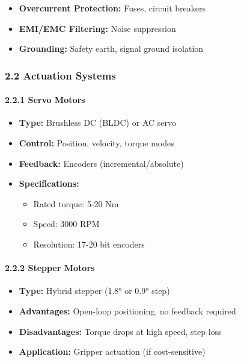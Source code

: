 \documentclass[
]{article}
\providecommand{\tightlist}{%
  \setlength{\itemsep}{0pt}\setlength{\parskip}{0pt}}
\begin{document}
\begin{itemize}
\tightlist
\item
  \textbf{Overcurrent Protection:} Fuses, circuit breakers
\item
  \textbf{EMI/EMC Filtering:} Noise suppression
\item
  \textbf{Grounding:} Safety earth, signal ground isolation
\end{itemize}

\hypertarget{actuation-systems}{%
\subsubsection{2.2 Actuation Systems}\label{actuation-systems}}

\hypertarget{servo-motors}{%
\paragraph{2.2.1 Servo Motors}\label{servo-motors}}

\begin{itemize}
\tightlist
\item
  \textbf{Type:} Brushless DC (BLDC) or AC servo
\item
  \textbf{Control:} Position, velocity, torque modes
\item
  \textbf{Feedback:} Encoders (incremental/absolute)
\item
  \textbf{Specifications:}

  \begin{itemize}
  \tightlist
  \item
    Rated torque: 5-20 Nm
  \item
    Speed: 3000 RPM
  \item
    Resolution: 17-20 bit encoders
  \end{itemize}
\end{itemize}

\hypertarget{stepper-motors}{%
\paragraph{2.2.2 Stepper Motors}\label{stepper-motors}}

\begin{itemize}
\tightlist
\item
  \textbf{Type:} Hybrid stepper (1.8° or 0.9° step)
\item
  \textbf{Advantages:} Open-loop positioning, no feedback required
\item
  \textbf{Disadvantages:} Torque drops at high speed, step loss
\item
  \textbf{Application:} Gripper actuation (if cost-sensitive)
\end{itemize}
\end{document}

